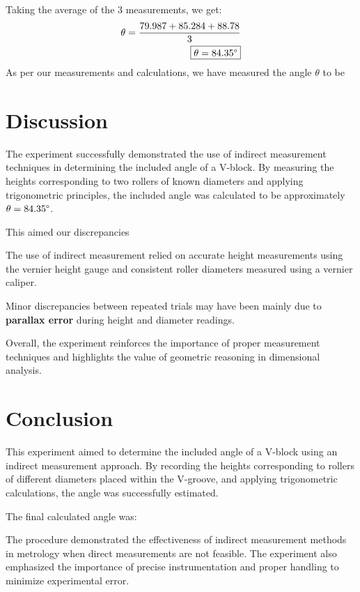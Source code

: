 \documentclass[12pt]{article}
\begin{document}
Taking the average of the 3 measurements, we get:
\begin{align}
	\theta=\frac{79.987+85.284+88.78}{3} \\
	\boxed{\theta=84.35 \degree}
\end{align}
As per our measurements and calculations, we have measured the angle $\theta$ to be \boxed{84.35\degree}
\section{Discussion}
The experiment successfully demonstrated the use of indirect measurement techniques in determining the included angle of a V-block. By measuring the heights corresponding to two rollers of known diameters and applying trigonometric principles, the included angle was calculated to be approximately $\theta = 84.35\degree$.

This aimed our discrepancies

The use of indirect measurement relied on accurate height measurements using the vernier height gauge and consistent roller diameters measured using a vernier caliper.

Minor discrepancies between repeated trials may have been mainly due to \textbf{parallax error} during height and diameter readings.

Overall, the experiment reinforces the importance of proper measurement techniques and highlights the value of geometric reasoning in dimensional analysis.
\section{Conclusion}
This experiment aimed to determine the included angle of a V-block using an indirect measurement approach. By recording the heights corresponding to rollers of different diameters placed within the V-groove, and applying trigonometric calculations, the angle was successfully estimated.

The final calculated angle was: \boxed{\theta=84.35\degree}

The procedure demonstrated the effectiveness of indirect measurement methods in metrology when direct measurements are not feasible. The experiment also emphasized the importance of precise instrumentation and proper handling to minimize experimental error.
\end{document}
